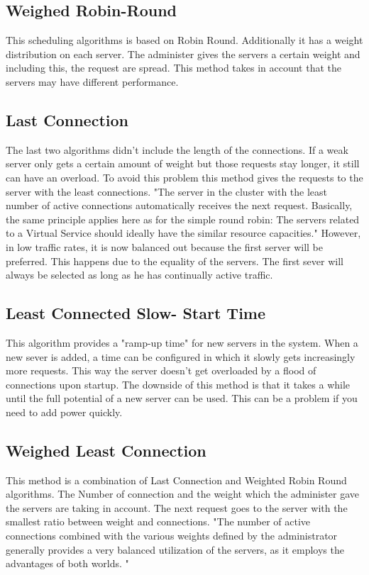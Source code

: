 \documentclass[12p]{article}
\begin{document}
	\subsection{Weighed Robin-Round}
	This scheduling algorithms is based on Robin Round. Additionally it has a weight distribution on each server. The administer gives the servers a certain weight and including this, the request are spread. This method takes in account that the servers may have different performance. 
		
	\subsection{Last Connection}
	The last two algorithms didn't include the length of the connections. If a weak server only gets a certain amount of weight but those requests stay longer, it still can have an overload. To avoid this problem this method gives the requests to the server with the least connections. "The server  in the cluster with the least number of active connections automatically receives the next  request. Basically, the same principle applies here as for the simple round robin: The servers  related to a Virtual Service should ideally have the similar resource capacities."\cite{schedu} However, in low traffic rates, it is now balanced out because the first server will be preferred. This happens due to the equality of the servers. The first sever will always be selected as long as he has continually active traffic. 
	
	\subsection{Least Connected Slow- Start Time}
	This algorithm provides a "ramp-up time" for new servers in the system. When a new sever is added, a time can be configured in which it slowly gets increasingly more requests. This way the server doesn't get overloaded by a flood of connections upon startup. The downside of this method is that it takes a while until the full potential of a new server can be used. This can be a problem if you need to add power quickly. 
	
	\subsection{Weighed Least Connection}
	This method is a combination of Last Connection and Weighted Robin Round algorithms. The Number of connection and the weight which the administer gave the servers are taking in account. The next request goes to the server with the smallest ratio between weight and connections. "The number of active connections combined with the various weights defined by the  administrator generally provides a very balanced utilization of the servers, as it employs the  advantages of both worlds. "\cite{schedu}
	
\end{document}
